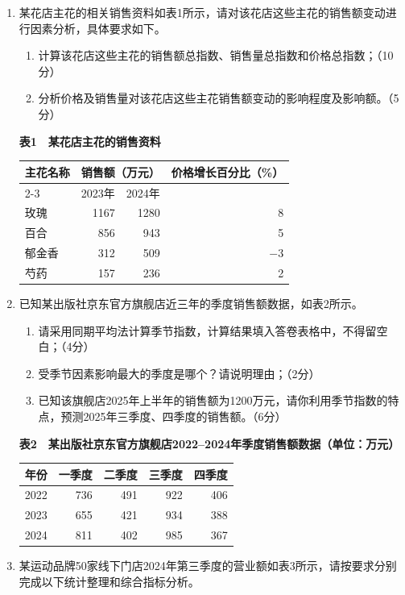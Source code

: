 \documentclass[UTF8,a4paper,10pt]{ctexart}
\begin{document}
\begin{enumerate}[start=41]
\item 某花店主花的相关销售资料如表1所示，请对该花店这些主花的销售额变动进行因素分析，具体要求如下。
\begin{enumerate}[label=（\arabic*）,leftmargin=2.8em]\item 计算该花店这些主花的销售额总指数、销售量总指数和价格总指数；（10分）\item 分析价格及销售量对该花店这些主花销售额变动的影响程度及影响额。（5分）\end{enumerate}
\begin{center}\textbf{表1　某花店主花的销售资料}\par
\begin{tabular}{lrrr}\toprule 主花名称&\multicolumn{2}{c}{销售额（万元）}&价格增长百分比（\%）\\\cmidrule(lr){2-3}&2023年&2024年&\\\midrule 玫瑰&1167&1280&8\\百合&856&943&5\\郁金香&312&509&$-3$\\芍药&157&236&2\\\bottomrule\end{tabular}\end{center}
\item 已知某出版社京东官方旗舰店近三年的季度销售额数据，如表2所示。
\begin{enumerate}[label=（\arabic*）,leftmargin=2.8em]\item 请采用同期平均法计算季节指数，计算结果填入答卷表格中，不得留空白；（4分）\item 受季节因素影响最大的季度是哪个？请说明理由；（2分）\item 已知该旗舰店2025年上半年的销售额为1200万元，请你利用季节指数的特点，预测2025年三季度、四季度的销售额。（6分）\end{enumerate}
\begin{center}\textbf{表2　某出版社京东官方旗舰店2022--2024年季度销售额数据（单位：万元）}\par
\begin{tabular}{crrrr}\toprule 年份&一季度&二季度&三季度&四季度\\\midrule 2022&736&491&922&406\\2023&655&421&934&388\\2024&811&402&985&367\\\bottomrule\end{tabular}\end{center}
\item 某运动品牌50家线下门店2024年第三季度的营业额如表3所示，请按要求分别完成以下统计整理和综合指标分析。

\end{enumerate}
\end{document}
